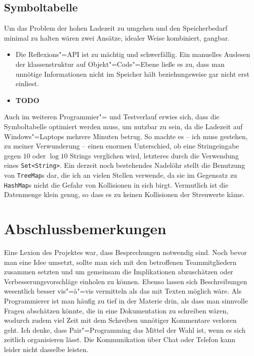 \documentclass[10pt,a4paper,ngerman,titlepage,tocindentauto]{scrartcl}
\newcommand{\TODO}{ {\LARGE\bf\color{crimson} TODO} }
\begin{document}
		\subsection{Symboltabelle}
			Um das Problem der hohen Ladezeit zu umgehen und den Speicherbedarf minimal zu halten wären zwei Ansätze,
			idealer Weise kombiniert, gangbar.
			\begin{itemize}
				\item Die Reflexions"=API ist zu mächtig und schwerfällig. Ein manuelles Auslesen der klassenstruktur
					auf Objekt"=Code"=Ebene ließe es zu, dass man unnötige Informationen nicht im Speicher hält beziehungsweise
					gar nicht erst einliest.
				\item \TODO
			\end{itemize}
			
			Auch im weiteren Programmier"= und Testverlauf erwies sich, dass die Symboltabelle optimiert werden muss, um
			nutzbar zu sein, da die Ladezeit auf Windows"=Laptops mehrere Minuten betrug. So machte es -- ich muss gestehen,
			zu meiner Verwunderung -- einen enormen Unterschied, ob eine Stringeingabe gegen $10$ oder $\log 10$ Strings verglichen
			wird, letzteres durch die Verwendung eines \verb|Set<String>|. Ein derzeit noch bestehendes Nadelöhr stellt die
			Benutzung von \texttt{TreeMap}s dar, die ich an vielen Stellen verwende, da sie im Gegensatz zu \texttt{HashMap}s
			nicht die Gefahr von Kollisionen in sich birgt. Vermutlich ist die Datenmenge klein genug, so dass es zu keinen
			Kollisionen der Streuwerte käme.
	
	\section[Abschlussbemerkungen]{\hypertarget{Abschlussbemerkungen}{Abschlussbemerkungen}}
		Eine Lexion des Projektes war, dass Besprechungen notwendig sind. Noch bevor man eine Idee umsetzt, sollte man
		sich mit den betroffenen Teammitgliedern zusammen setzten und um gemeinsam die Implikationen abzuschätzen
		oder Verbesserungsvorschläge einholen zu können. Ebenso lassen sich Beschreibungen wesentlich besser vis"=à"=vis
		vermitteln als das mit Texten möglich wäre. Als Programmierer ist man häufig zu tief in der Materie drin, als dass
		man sinnvolle Fragen abschätzen könnte, die in eine Dokumentation zu schreiben wären, wodurch zudem viel Zeit
		mit dem Schreiben unnötiger Kommentare verloren geht. Ich denke, dass Pair"=Programming das Mittel der Wahl ist,
		wenn es sich zeitlich organisieren lässt. Die Kommunikation über Chat oder Telefon kann leider nicht dasselbe leisten.
		
\end{document}

